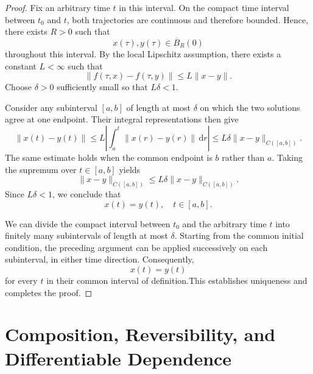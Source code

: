\documentclass[12pt,a4paper,oneside]{book}
\begin{document}
\begin{proof}
Fix an arbitrary time $t$ in this interval. On the compact time interval between $t_0$ and $t$, both trajectories are
continuous and therefore bounded. Hence, there exists $R>0$ such that
\begin{equation*}
    x(\tau),y(\tau)\in\overline B_R(0)
\end{equation*}
throughout this interval. By the local Lipschitz assumption, there exists a constant $L<\infty$ such that
\begin{equation*}
    \|f(\tau,x)-f(\tau,y)\| \leq L\|x-y\|.
\end{equation*}
Choose $\delta>0$ sufficiently small so that $L\delta<1$.

Consider any subinterval $[a,b]$ of length at most $\delta$ on which the two solutions agree at one endpoint. Their integral
representations then give
\begin{equation*}
    \|x(t)-y(t)\| \leq L\left|
        \int_a^t\|x(r)-y(r)\|\,\mathrm dr
    \right|
    \leq L\delta \|x-y\|_{C([a,b])}.
\end{equation*}
The same estimate holds when the common endpoint is $b$ rather than $a$. Taking the supremum over $t\in[a,b]$ yields
\begin{equation*}
    \|x-y\|_{C([a,b])} \leq L\delta\|x-y\|_{C([a,b])}.
\end{equation*}
Since $L\delta<1$, we conclude that
\begin{equation*}
    x(t)=y(t), \quad t\in[a,b].
\end{equation*}

We can divide the compact interval between $t_0$ and the arbitrary time $t$ into finitely many subintervals of length at
most $\delta$. Starting from the common initial condition, the preceding argument can be applied successively on each
subinterval, in either time direction. Consequently,
\begin{equation*}
    x(t)=y(t)
\end{equation*}
for every $t$ in their common interval of definition.This establishes uniqueness and completes the proof.
\end{proof}


\section{Composition, Reversibility, and Differentiable Dependence}
\label{app:flow-proof}
\end{document}
